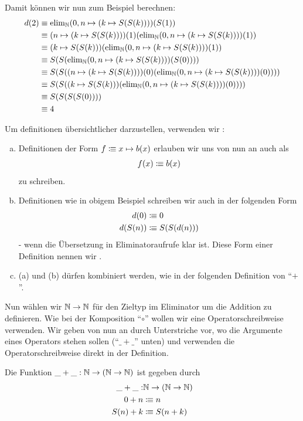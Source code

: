 Damit können wir nun zum Beispiel berechnen:
\begin{align*}
  d(2)&\equiv \mathrm{elim}_{\mathbb{N}}(0,n\mapsto (k\mapsto S(S(k))))(S(1)) \\
      &\equiv (n\mapsto (k\mapsto S(S(k))))(1)(\mathrm{elim}_{\mathbb{N}}(0,n\mapsto (k\mapsto S(S(k))))(1)) \\
      &\equiv (k\mapsto S(S(k)))(\mathrm{elim}_{\mathbb{N}}(0,n\mapsto (k\mapsto S(S(k))))(1)) \\
      &\equiv S(S(\mathrm{elim}_{\mathbb{N}}(0,n\mapsto (k\mapsto S(S(k))))(S(0)))) \\
      &\equiv S(S((n\mapsto (k\mapsto S(S(k))))(0)(\mathrm{elim}_{\mathbb{N}}(0,n\mapsto (k\mapsto S(S(k))))(0)))) \\
      &\equiv S(S((k\mapsto S(S(k)))(\mathrm{elim}_{\mathbb{N}}(0,n\mapsto (k\mapsto S(S(k))))(0)))) \\
      &\equiv S(S(S(S(0)))) \\
      &\equiv 4
\end{align*}

Um definitionen übersichtlicher darzustellen, verwenden wir :

\begin{konvention}
\begin{enumerate}[(a)]
\item Definitionen der Form $f\vcentcolon\mspace{-1.2mu}\equiv x\mapsto b(x)$ erlauben wir uns von nun an auch als
  \begin{align*}
    f(x)\vcentcolon\mspace{-1.2mu}\equiv b(x)
  \end{align*}
  zu schreiben. 
\item Definitionen wie in obigem Beispiel schreiben wir auch in der folgenden Form
  \begin{align*}
    d(0)&\vcentcolon\mspace{-1.2mu}\equiv 0 \\
    d(S(n))&\vcentcolon\mspace{-1.2mu}\equiv S(S(d(n))) 
  \end{align*}
  - wenn die Übersetzung in Eliminatoraufrufe klar ist.
  Diese Form einer Definition nennen wir .
\item (a) und (b) dürfen kombiniert werden, wie in der folgenden Definition von ``$+$''.
\end{enumerate}
\end{konvention}

Nun wählen wir $\mathbb{N}\to\mathbb{N}$ für den Zieltyp im Eliminator um die Addition zu definieren.
Wie bei der Komposition ``$\circ$'' wollen wir eine Operatorschreibweise verwenden.
Wir geben von nun an durch Unterstriche vor, wo die Argumente eines Operators stehen sollen (``$\_+\_$'' unten) und verwenden die Operatorschreibweise direkt in der Definition.
\begin{definition}
  Die Funktion $\_+\_:\mathbb{N}\to (\mathbb{N}\to \mathbb{N})$ ist gegeben durch
  \begin{align*}
    \_+\_:&\mathbb{N}\to (\mathbb{N}\to \mathbb{N}) \\
      0+n&\vcentcolon\mspace{-1.2mu}\equiv n \\
     S(n)+k&\vcentcolon\mspace{-1.2mu}\equiv S(n+k)
  \end{align*}
\end{definition}

